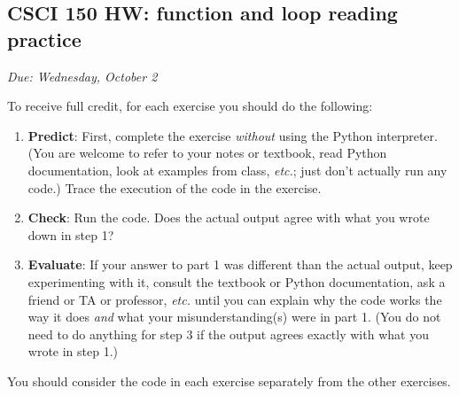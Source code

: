 \documentclass[]{article}
\date{}
\begin{document}
\hypertarget{csci-150-hw-function-and-loop-reading-practice}{%
\subsection{CSCI 150 HW: function and loop reading
practice}\label{csci-150-hw-function-and-loop-reading-practice}}

\emph{Due: Wednesday, October 2}

To receive full credit, for each exercise you should do the following:

\begin{enumerate}
\def\labelenumi{\arabic{enumi}.}
\item
  \textbf{Predict}: First, complete the exercise \emph{without} using
  the Python interpreter. (You are welcome to refer to your notes or
  textbook, read Python documentation, look at examples from class,
  \emph{etc.}; just don't actually run any code.) Trace the execution of
  the code in the exercise.
\item
  \textbf{Check}: Run the code. Does the actual output agree with what
  you wrote down in step 1?
\item
  \textbf{Evaluate}: If your answer to part 1 was different than the
  actual output, keep experimenting with it, consult the textbook or
  Python documentation, ask a friend or TA or professor, \emph{etc.}
  until you can explain why the code works the way it does \emph{and}
  what your misunderstanding(s) were in part 1. (You do not need to do
  anything for step 3 if the output agrees exactly with what you wrote
  in step 1.)
\end{enumerate}

You should consider the code in each exercise separately from the other
exercises.
\end{document}
